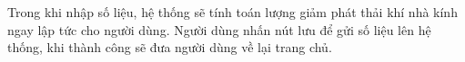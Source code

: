Trong khi nhập số liệu, hệ thống sẽ tính toán lượng giảm phát thải khí nhà kính ngay lập tức cho người dùng.
Người dùng nhấn nút lưu để gửi số liệu lên hệ thống, khi thành công sẽ đưa người dùng về lại trang chủ.

\begin{figure}[H]
  \centering
  \hfill
  \hfill

\end{figure}
